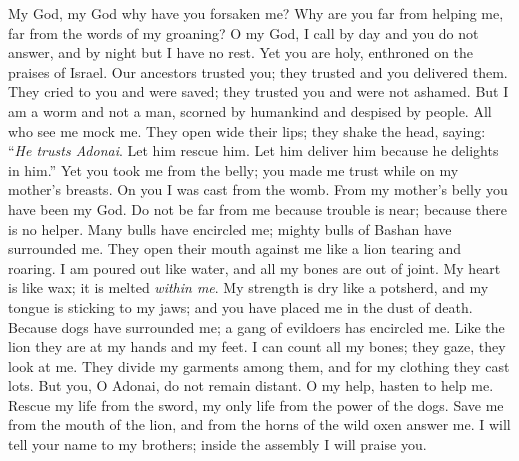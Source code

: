 \begin{biblechapter} %
 My God, my God why have you forsaken me? 
Why are you far from helping me, far from the words of my groaning?
\verse O my God, I call by day and you do not answer, 
and by night but I have no rest.
\verse Yet you are holy, 
enthroned on the praises of Israel.
\verse Our ancestors trusted you; 
they trusted and you delivered them.
\verse They cried to you and were saved; 
they trusted you and were not ashamed.
\verse But I am a worm and not a man, 
scorned by humankind and despised by people.
\verse All who see me mock me. 
They open wide their lips; 
they shake the head, saying:
\verse “\textit{He trusts Adonai}. Let him rescue him. 
Let him deliver him because he delights in him.”
\verse Yet you took me from the belly; 
you made me trust while on my mother’s breasts.
\verse On you I was cast from the womb. 
From my mother’s belly you have been my God.
\verse Do not be far from me 
because trouble is near; 
because there is no helper.
\verse Many bulls have encircled me; 
mighty bulls of Bashan have surrounded me.
\verse They open their mouth against me 
like a lion tearing and roaring.
\verse I am poured out like water, 
and all my bones are out of joint. 
My heart is like wax; 
it is melted \textit{within me}.
\verse My strength is dry like a potsherd, 
and my tongue is sticking to my jaws; 
and you have placed me in the dust of death.
\verse Because dogs have surrounded me; 
a gang of evildoers has encircled me. 
Like the lion they are at my hands and my feet.
\verse I can count all my bones; 
they gaze, they look at me.
\verse They divide my garments among them, 
and for my clothing they cast lots.
\verse But you, O Adonai, do not remain distant. 
O my help, hasten to help me.
\verse Rescue my life from the sword, 
my only life from the power of the dogs.
\verse Save me from the mouth of the lion, 
and from the horns of the wild oxen answer me.
\verse I will tell your name to my brothers; 
inside the assembly I will praise you.

\end{biblechapter}
